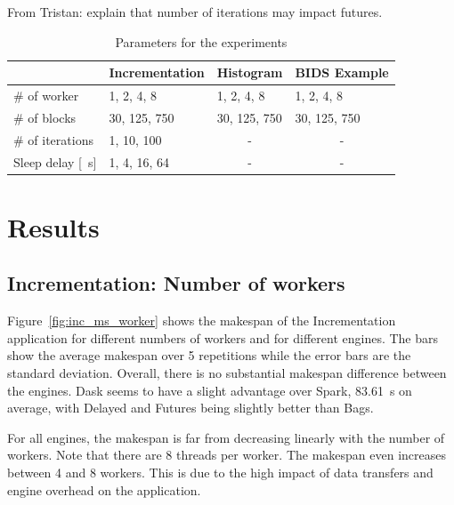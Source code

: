 \documentclass[conference]{IEEEtran}
\newcommand{\TG}[1]{\color{cyan}From Tristan: #1 \color{black}}
\begin{document}
\TG{explain that number of iterations may impact futures.}


\begin{table}[!t]
    \renewcommand{\arraystretch}{1.3}
    \caption{Parameters for the experiments}\label{tab:param}
    \centering
    \begin{tabular*}{\columnwidth}{llll}
    \hline
                        & Incrementation & Histogram             & BIDS Example          \\ \hline
    \# of worker        & 1, 2, 4, 8     & 1, 2, 4, 8            & 1, 2, 4, 8            \\
    \# of blocks        & 30, 125, 750   & 30, 125, 750          & 30, 125, 750          \\
    \# of iterations    & 1, 10, 100     & \multicolumn{1}{c}{-} & \multicolumn{1}{c}{-} \\
    Sleep delay {[}\SI{}{\second}{]} & 1, 4, 16, 64   & \multicolumn{1}{c}{-} & \multicolumn{1}{c}{-} \\ \hline
    \end{tabular*}
    \end{table}






\section{Results}

\subsection{Incrementation: Number of workers}
Figure~\ref{fig:inc_ms_worker} shows the makespan of the Incrementation application
for different numbers of workers and for different engines. The bars show the average
makespan over 5 repetitions while the error bars are the standard deviation. Overall,
there is no substantial makespan difference between the engines. Dask seems to have a
slight advantage over Spark, \SI{83.61}{\second} on average,
with Delayed and Futures being slightly better than Bags.

For all engines, the makespan is far from decreasing linearly with the
number of workers. Note that there are 8 threads per worker. The makespan
even increases between 4 and 8 workers. This is due to the high impact of
data transfers and engine overhead on the application. 
\end{document}
